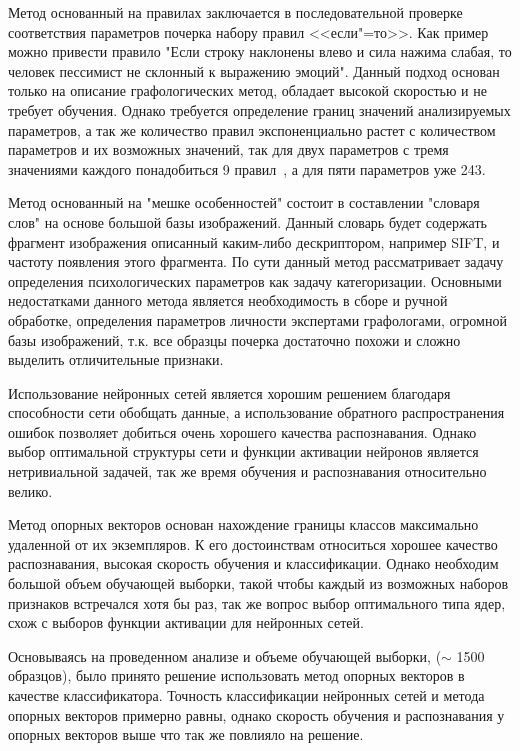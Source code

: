 Метод основанный на правилах заключается в последовательной проверке соответствия параметров почерка набору правил <<если"=то>>. Как пример можно привести правило "Если строку наклонены влево и сила нажима слабая, то человек пессимист не склонный к выражению эмоций". Данный подход основан только на описание графологических метод, обладает высокой скоростью и не требует обучения. Однако требуется определение границ значений анализируемых параметров, а так же количество правил экспоненциально растет с количеством параметров и их возможных значений, так для двух параметров с тремя значениями каждого понадобиться 9 правил~\cite{champa_ananda_kumar_rule_base}, а для пяти параметров уже 243.

Метод основанный на "мешке особенностей" состоит в составлении "словаря слов" на основе большой базы изображений. Данный словарь будет содержать фрагмент изображения описанный каким-либо дескриптором, например SIFT, и частоту появления этого фрагмента. По сути данный метод рассматривает задачу определения психологических параметров как задачу категоризации. Основными недостатками данного метода является необходимость в сборе и ручной обработке, определения параметров личности экспертами графологами, огромной базы изображений, т.к. все образцы почерка достаточно похожи и сложно выделить отличительные признаки.

Использование нейронных сетей является хорошим решением благодаря способности сети обобщать данные, а использование обратного распространения ошибок позволяет добиться очень хорошего качества распознавания. Однако выбор оптимальной структуры сети и функции активации нейронов является нетривиальной задачей, так же время обучения и распознавания относительно велико.

Метод опорных векторов основан нахождение границы классов максимально удаленной от их экземпляров. К его достоинствам относиться хорошее качество распознавания, высокая скорость обучения и классификации. Однако необходим большой объем обучающей выборки, такой чтобы каждый из возможных наборов признаков встречался хотя бы раз, так же вопрос выбор оптимального типа ядер, схож с выборов функции активации для нейронных сетей.

Основываясь на проведенном анализе и объеме обучающей выборки, ($\sim$ 1500 образцов), было принято решение использовать метод опорных векторов в качестве классификатора. Точность классификации нейронных сетей и метода опорных векторов примерно равны, однако скорость обучения и распознавания у опорных векторов выше что так же повлияло на решение.

